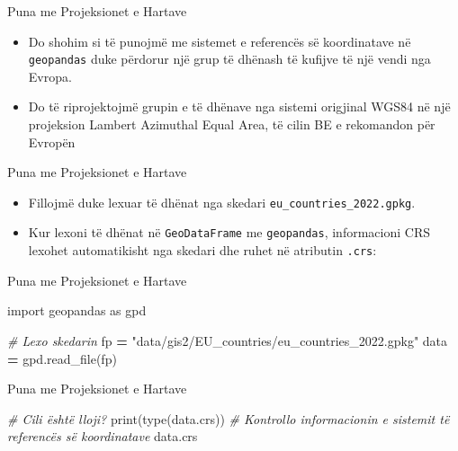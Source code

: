 \documentclass[
  ignorenonframetext,
]{beamer}
\newenvironment{Shaded}{\begin{snugshade}}{\end{snugshade}}
\newcommand{\BuiltInTok}[1]{#1}
\newcommand{\CommentTok}[1]{\textcolor[rgb]{0.56,0.35,0.01}{\textit{#1}}}
\newcommand{\ImportTok}[1]{#1}
\newcommand{\NormalTok}[1]{#1}
\newcommand{\OperatorTok}[1]{\textcolor[rgb]{0.81,0.36,0.00}{\textbf{#1}}}
\newcommand{\StringTok}[1]{\textcolor[rgb]{0.31,0.60,0.02}{#1}}
\begin{document}
\begin{frame}[fragile]{Puna me Projeksionet e Hartave}
\protect\hypertarget{puna-me-projeksionet-e-hartave-11}{}
\begin{itemize}
\item
  Do shohim si të punojmë me sistemet e referencës së koordinatave në
  \texttt{geopandas} duke përdorur një grup të dhënash të kufijve të një
  vendi nga Evropa.
\item
  Do të riprojektojmë grupin e të dhënave nga sistemi origjinal WGS84 në
  një projeksion Lambert Azimuthal Equal Area, të cilin BE e rekomandon
  për Evropën
\end{itemize}
\end{frame}

\begin{frame}[fragile]{Puna me Projeksionet e Hartave}
\protect\hypertarget{puna-me-projeksionet-e-hartave-12}{}
\begin{itemize}
\item
  Fillojmë duke lexuar të dhënat nga skedari
  \texttt{eu\_countries\_2022.gpkg}.
\item
  Kur lexoni të dhënat në \texttt{GeoDataFrame} me \texttt{geopandas},
  informacioni CRS lexohet automatikisht nga skedari dhe ruhet në
  atributin \texttt{.crs}:
\end{itemize}
\end{frame}

\begin{frame}[fragile]{Puna me Projeksionet e Hartave}
\protect\hypertarget{puna-me-projeksionet-e-hartave-13}{}

\begin{Shaded}
\begin{Highlighting}[]
\ImportTok{import}\NormalTok{ geopandas }\ImportTok{as}\NormalTok{ gpd}

\CommentTok{\# Lexo skedarin}
\NormalTok{fp }\OperatorTok{=} \StringTok{"data/gis2/EU\_countries/eu\_countries\_2022.gpkg"}
\NormalTok{data }\OperatorTok{=}\NormalTok{ gpd.read\_file(fp)}
\end{Highlighting}
\end{Shaded}
\end{frame}

\begin{frame}[fragile]{Puna me Projeksionet e Hartave}
\protect\hypertarget{puna-me-projeksionet-e-hartave-14}{}

\begin{Shaded}
\begin{Highlighting}[]
\CommentTok{\# Cili është lloji?}
\BuiltInTok{print}\NormalTok{(}\BuiltInTok{type}\NormalTok{(data.crs))}
\CommentTok{\# Kontrollo informacionin e sistemit të referencës së koordinatave}
\NormalTok{data.crs}
\end{Highlighting}
\end{Shaded}
\end{frame}
\end{document}
